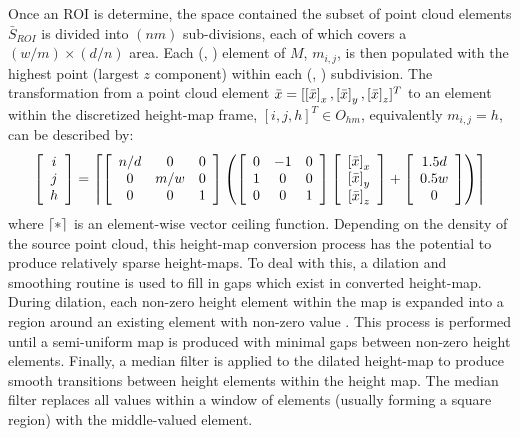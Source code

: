 			Once an ROI is determine, the space contained the subset of point cloud elements $\bar{S}_{ROI}$ is divided into $(nm)$ sub-divisions, each of which covers a $(w/m) \times (d/n)$ area. Each (\Ith, \Jth) element of $M$, $m_{i,j}$, is then populated with the highest point (largest  $z$ component) within each  (\Ith, \Jth) subdivision. The transformation from a point cloud element $\bar{x} = [\left[\bar{x}\right]_{x},\left[\bar{x}\right]_{y},\left[\bar{x}\right]_{z}]^{T}$ to an element within the discretized height-map frame, $[i,j,h]^{T} \in O_{hm}$, equivalently $m_{i,j}=h$, can be described by:
				\begin{equation}
					\left[
						\begin{array}{c}
						i \\
						j \\
						h  	\\
						\end{array}
					\right]
					=
					\left\lceil
						\left[
							\begin{array}{ccc}
							n/d & 0 	& 0 \\
							0 	& m/w 	& 0 \\
							0 	& 0 	& 1 \\
							\end{array}
						\right]
						\left(
							\left[
								\begin{array}{ccc}
								0 &-1 & 0 \\
								1 & 0 & 0 \\
								0 & 0 & 1 \\
								\end{array}
							\right]
							\left[
								\begin{array}{c}
								\left[\bar{x}\right]_{x} \\
								\left[\bar{x}\right]_{y} \\
								\left[\bar{x}\right]_{z} \\
								\end{array}
							\right]
							+
							\left[
								\begin{array}{c}
								1.5 d \\
								0.5 w \\
								0 \\
								\end{array}
							\right]
						\right)
					\right\rceil
					\label{eq::toheightmapframe}
				\end{equation}
			where $\left\lceil*\right\rceil$ is an element-wise vector ceiling function. Depending on the density of the source point cloud, this height-map conversion process has the potential to produce relatively sparse height-maps. To deal with this, a dilation and smoothing routine is used to fill in gaps which exist in converted height-map. During dilation, each non-zero height element within the map is expanded into a region around an existing element with non-zero value \cite{opencv_learn_immorph}. This process is performed until a semi-uniform map is produced with minimal gaps between non-zero height elements. Finally, a median filter is applied to the dilated height-map to produce smooth transitions between height elements within the height map. The median filter replaces all values within a window of elements (usually forming a square region) with the middle-valued element.
